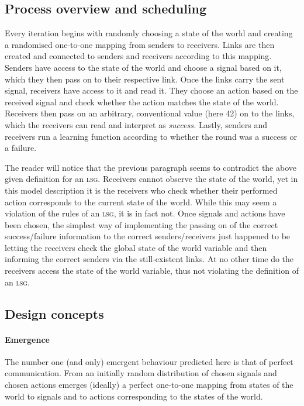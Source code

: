 \documentclass[
	DIV=calc,
	BCOR=0mm,
	pagesize,
]{scrartcl}
\newcommand{\lsg}{\textsc{lsg}}
\begin{document}
\subsection{Process overview and scheduling}
\label{ssec:modpro}
Every iteration begins with randomly choosing a state of the world and creating a randomised one-to-one mapping from senders to receivers.
Links are then created and connected to senders and receivers according to this mapping.
Senders have access to the state of the world and choose a signal based on it, which they then pass on to their respective link.
Once the links carry the sent signal, receivers have access to it and read it.
They choose an action based on the received signal and check whether the action matches the state of the world.
Receivers then pass on an arbitrary, conventional value (here 42) on to the links, which the receivers can read and interpret as \emph{success.}
Lastly, senders and receivers run a learning function according to whether the round was a success or a failure.

The reader will notice that the previous paragraph seems to contradict the above given definition for an \lsg.
Receivers cannot observe the state of the world, yet in this model description it is the receivers who check whether their performed action corresponds to the current state of the world.
While this may seem a violation of the rules of an \lsg, it is in fact not.
Once signals and actions have been chosen, the simplest way of implementing the passing on of the correct success/failure information to the correct senders/receivers just happened to be letting the receivers check the global state of the world variable and then informing the correct senders via the still-existent links.
At no other time do the receivers access the state of the world variable, thus not violating the definition of an \lsg.
 

\subsection{Design concepts}
\label{ssec:moddes}
\paragraph{Emergence}
The number one (and only) emergent behaviour predicted here is that of perfect communication.
From an initially random distribution of chosen signals and chosen actions emerges (ideally) a perfect one-to-one mapping from states of the world to signals and to actions corresponding to the states of the world.
\end{document}
